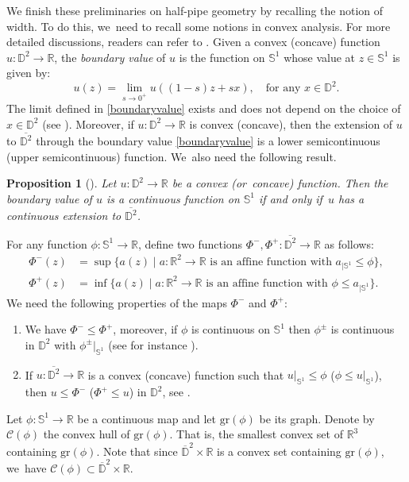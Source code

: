 \documentclass[10pt]{amsart}
\let\ra\rightarrow
\theoremstyle{plain}
\newtheorem{prop}[cor]{Proposition}
\theoremstyle{definition}
\begin{document}
We finish these preliminaries on half-pipe geometry by recalling the notion of width. To do this, we~need to recall some notions in convex analysis. For more detailed discussions, readers can refer to \cite{Rockconvex}.
Given a convex (\resp concave) function $u:\mathbb{D}^2\to \mathbb{R}$, the \emph{boundary value} of $u$ is the function on $\mathbb{S}^1$ whose value at $z\in\mathbb{S}^1$ is given by: \begin{equation}\label{boundaryvalue}
u(z) = \lim_{s \to 0^+}u((1-s)z+sx),\quad\text{for any } x\in\mathbb{D}^2.
\end{equation}
The limit defined in \eqref{boundaryvalue} exists and does not depend on the choice of $x\in \mathbb{D}^2$ (see \cite[\S 4]{ConvexAnal}). Moreover, if $u:\mathbb{D}^2\to\mathbb{R}$ is convex (\resp concave), then the extension of $u$ to $\overline{\mathbb{D}^2}$ through the boundary value \eqref{boundaryvalue} is a lower semicontinuous (\resp upper semicontinuous) function. We~also need the following result.
\begin{prop}[{\cite[Prop.\,4.2]{ConvexAnal}}]
\label{boundaryvalueextension}
Let $u: \mathbb{D}^2\to\mathbb{R}$ be a convex (or~concave) function. Then the boundary value of $u$ is a continuous function on $\mathbb{S}^1$ if and only if~$u$ has a continuous extension to $\overline{\mathbb{D}^2}$.
\end{prop}
For any function $\phi: \mathbb{S}^1 \to \mathbb{R}$, define two functions $\Phi^-, \Phi^+: \overline{\mathbb{D}^2} \to \mathbb{R}$ as follows:\vspace*{-3pt}
\begin{align}\label{phi-}
\Phi^-(z)&=\sup\{ a(z)\mid a:\mathbb{R}^2\ra\mathbb{R} \text{ is an affine function with } a_{\mid\mathbb{S}^1}\leq\phi \},
\\
\label{phi+}
\Phi^+(z)&=\inf\{ a(z)\mid a:\mathbb{R}^2\ra\mathbb{R} \text{ is an affine function with } \phi\leq a_{\mid\mathbb{S}^1} \}.
\end{align}
We need the following properties of the maps $\Phi^-$ and $\Phi^+$:\label{page 8}
\begin{enumerate}
\item[(P1)]\label{P1}
We have $\Phi^-\leq\Phi^+$, moreover, if $\phi$ is continuous on $\mathbb{S}^1$ then $\phi^{\pm}$ is continuous in $\mathbb{D}^2$ with $\phi^{\pm}|_{\mathbb{S}^1}$ (see for instance \cite[Lem.\,4.6]{ConvexAnal}).
\item[(P2)]\label{P2} If $u:\overline{\mathbb{D}^2}\to\mathbb{R}$ is a convex (\resp concave) function such that $u |_{\mathbb{S}^1}\leq \phi$ (\resp $\phi\leq u |_{\mathbb{S}^1} $), then $u\leq\Phi^-$ (\resp $\Phi^+\leq u$) in $\mathbb{D}^2$, see \cite[Cor.\,4.5]{ConvexAnal}.
\end{enumerate}
Let $\phi:\mathbb{S}^1\to\mathbb{R}$ be a continuous map and let $\mathrm{gr}(\phi)$ be its graph. Denote by $\mathcal{C}(\phi)$ the convex hull of $\mathrm{gr}(\phi)$. That is, the smallest convex set of $\mathbb{R}^3$ containing $\mathrm{gr}(\phi)$. Note that since $\overline{\mathbb{D}}^2\times\mathbb{R}$ is a convex set containing $\mathrm{gr}(\phi)$, we~have $\mathcal{C}(\phi)\subset\overline{\mathbb{D}}^2\times\mathbb{R}$.
\end{document}
